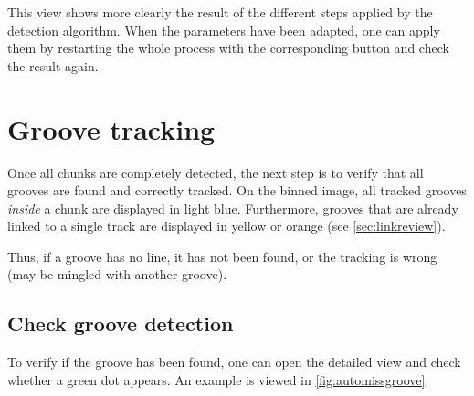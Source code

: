 This view shows more clearly the result of the different steps applied by the detection algorithm. When the parameters have been adapted, one can apply them by restarting the whole process with the corresponding button and check the result again.

\section{Groove tracking}

Once all chunks are completely detected, the next step is to verify that all grooves are found and correctly tracked. On the binned image, all tracked grooves \emph{inside} a chunk are displayed in light blue. Furthermore, grooves that are already linked to a single track are displayed in yellow or orange (see \autoref{sec:linkreview}).

Thus, if a groove has no line, it has not been found, or the tracking is wrong (may be mingled with another groove).

\subsection{Check groove detection}

To verify if the groove has been found, one can open the detailed view and check whether a green dot appears. An example is viewed in \autoref{fig:automissgroove}.

